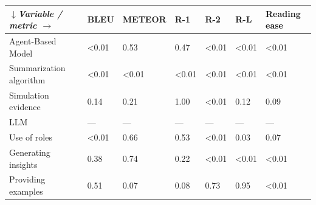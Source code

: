 \begin{tabular}{|l|l|l|l|l|l|l|}
\hline
\textit{$\downarrow$Variable / metric $\rightarrow$} & BLEU & METEOR & R-1 & R-2 & R-L & Reading ease \\
 \hline
 Agent-Based Model & \textless{}0.01 & 0.53 & 0.47 & \textless{}0.01 & \textless{}0.01 & \textless{}0.01 \\
 \hline
 Summarization algorithm & \textless{}0.01 & \textless{}0.01 & \textless{}0.01 & \textless{}0.01 & \textless{}0.01 & \textless{}0.01 \\
 \hline
 Simulation evidence & 0.14 & 0.21 & 1.00 & \textless{}0.01 & 0.12 & 0.09 \\
 \hline
 LLM & — & — & — & — & — & — \\
 \hline
 Use of roles & \textless{}0.01 & 0.66 & 0.53 & \textless{}0.01 & 0.03 & 0.07 \\
 \hline
 Generating insights & 0.38 & 0.74 & 0.22 & \textless{}0.01 & \textless{}0.01 & \textless{}0.01 \\
 \hline
 Providing examples & 0.51 & 0.07 & 0.08 & 0.73 & 0.95 & \textless{}0.01 \\
\hline
\end{tabular}
